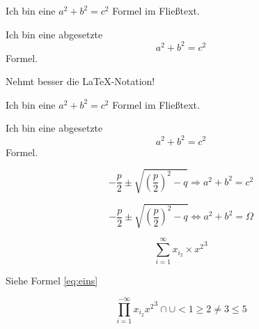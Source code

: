 \documentclass[12pt,ngerman,parskip=half]{scrartcl}
\begin{document}
\blindtext

Ich bin eine $a^2+b^2=c^2$ Formel im Fließtext. %

Ich bin eine abgesetzte $$a^2+b^2=c^2$$ Formel. %

Nehmt besser die \LaTeX-Notation!

Ich bin eine \(a^2+b^2=c^2\) Formel im Fließtext. %

Ich bin eine abgesetzte \[a^2+b^2=c^2\] Formel. %

\begin{equation}
- \frac{p}{2} \pm \sqrt{ \left(\frac{p}{2}\right)^2  -q  } \Rightarrow a^2 + b^2 = c^2
\end{equation}

\begin{equation}
- \frac{p}{2} \pm \sqrt{ \left(\frac{p}{2}\right)^2  -q  } \Leftrightarrow a^2 + b^2 = \Omega
\end{equation}

\begin{equation}
\sum_{i=1}^{\infty} x_{i_2} \times {x^2}^3
\end{equation}

Siehe Formel \ref{eq:eins}

\begin{equation}
\prod_{i=1}^{-\infty} x_{i_2} {x^2}^3 \cap \cup < 1 \geq 2 \not= 3 \leq 5 \label{eq:eins}
\end{equation}
\end{document}
